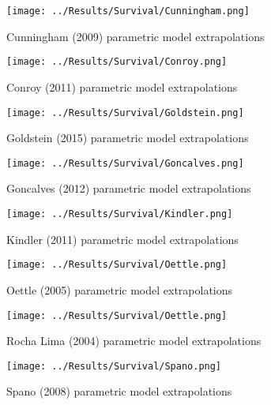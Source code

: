 \begin{figure}[h]
    \centering
    \texttt{[image: ../Results/Survival/Cunningham.png]}
    \caption{Cunningham (2009) parametric model extrapolations}
    \label{fig:cunninghamParamExtrap}
\end{figure}

\begin{figure}[h]
    \centering
    \texttt{[image: ../Results/Survival/Conroy.png]}
    \caption{Conroy (2011) parametric model extrapolations}
    \label{fig:conroyParamExtrap}
\end{figure}

\begin{figure}[h]
    \centering
    \texttt{[image: ../Results/Survival/Goldstein.png]}
    \caption{Goldstein (2015) parametric model extrapolations}
    \label{fig:goldsteinParamExtrap}
\end{figure}

\begin{figure}[h]
    \centering
    \texttt{[image: ../Results/Survival/Goncalves.png]}
    \caption{Goncalves (2012) parametric model extrapolations}
    \label{fig:goncalvesParamExtrap}
\end{figure}

\begin{figure}[h]
    \centering
    \texttt{[image: ../Results/Survival/Kindler.png]}
    \caption{Kindler (2011) parametric model extrapolations}
    \label{fig:kindlerParamExtrap}
\end{figure}

\begin{figure}[h]
    \centering
    \texttt{[image: ../Results/Survival/Oettle.png]}
    \caption{Oettle (2005) parametric model extrapolations}
    \label{fig:oettleParamExtrap}
\end{figure}

\begin{figure}[h]
    \centering
    \texttt{[image: ../Results/Survival/Oettle.png]}
    \caption{Rocha Lima (2004) parametric model extrapolations}
    \label{fig:rochaLimaParamExtrap}
\end{figure}

\begin{figure}[h]
    \centering
    \texttt{[image: ../Results/Survival/Spano.png]}
    \caption{Spano (2008) parametric model extrapolations}
    \label{fig:spanoParamExtrap}
\end{figure}